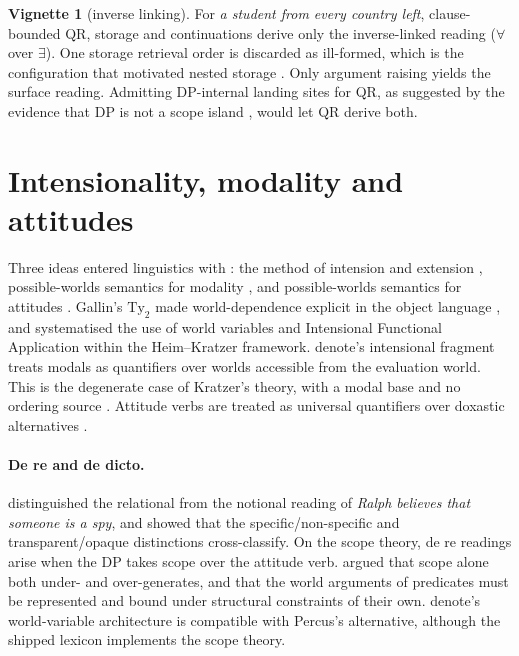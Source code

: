 \documentclass[11pt,a4paper]{article}
\newcommand{\dn}{\textsf{denote}}
\theoremstyle{definition}
\newtheorem{vignette}{Vignette}
\begin{document}
\begin{vignette}[inverse linking]\label{v:inverse}
For \textit{a student from every country left}, clause-bounded QR, storage and continuations derive only the inverse-linked reading ($\forall$ over $\exists$). One storage retrieval order is discarded as ill-formed, which is the configuration that motivated nested storage \citep{keller1988}. Only argument raising yields the surface reading. Admitting DP-internal landing sites for QR, as suggested by the evidence that DP is not a scope island \citep{may1985,sauerland2005}, would let QR derive both.
\end{vignette}

\section{Intensionality, modality and attitudes}\label{sec:intensional}

Three ideas entered linguistics with \citet{montague1973}: the method of intension and extension \citep{carnap1947}, possible-worlds semantics for modality \citep{kripke1963}, and possible-worlds semantics for attitudes \citep{hintikka1969}. Gallin's $\mathrm{Ty}_2$ made world-dependence explicit in the object language \citep{gallin1975}, and \citet{vonfintelheim2011} systematised the use of world variables and Intensional Functional Application within the Heim--Kratzer framework. \dn{}'s intensional fragment treats modals as quantifiers over worlds accessible from the evaluation world. This is the degenerate case of Kratzer's theory, with a modal base and no ordering source \citep{kratzer1977,kratzer2012}. Attitude verbs are treated as universal quantifiers over doxastic alternatives \citep{hintikka1969}.

\paragraph{De re and de dicto.} \citet{quine1956} distinguished the relational from the notional reading of \textit{Ralph believes that someone is a spy}, and \citet{fodor1970} showed that the specific/non-specific and transparent/opaque distinctions cross-classify. On the scope theory, de re readings arise when the DP takes scope over the attitude verb. \citet{percus2000} argued that scope alone both under- and over-generates, and that the world arguments of predicates must be represented and bound under structural constraints of their own. \dn{}'s world-variable architecture is compatible with Percus's alternative, although the shipped lexicon implements the scope theory.
\end{document}
